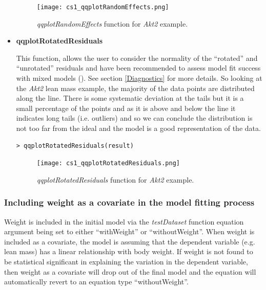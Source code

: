 \documentclass[12pt,a4paper]{article}
\begin{document}
\begin{itemize}
\begin{figure}[H]%
\centerline{\texttt{[image: cs1\_qqplotRandomEffects.png]}}
\caption{\textit{qqplotRandomEffects} function for \textit{Akt2} example.}\label{fig:20}
\end{figure}

\item \textbf{qqplotRotatedResiduals}

This function, allows the user to consider the normality of the ``rotated'' and ``unrotated'' residuals and have been recommended to assess model fit success with mixed models (\cite{RotatedResiduals04}). 
See section \ref{Diagnostics} for more details. 
So looking at the \textit{Akt2} lean mass example, the majority of the data points are distributed along the line. 
There is some systematic deviation at the tails but it is a small percentage of the points and as it is above and below the line it indicates long tails (i.e. outliers) 
and so we can conclude the distribution is not too far from the ideal and the model is a good representation of the data. 

\begingroup
    \fontsize{8pt}{12pt}\selectfont
\begin{verbatim}
> qqplotRotatedResiduals(result)
\end{verbatim}
\endgroup 

\begin{figure}[H]%
\centerline{\texttt{[image: cs1\_qqplotRotatedResiduals.png]}}
\caption{\textit{qqplotRotatedResiduals} function for \textit{Akt2} example.}\label{fig:21}
\end{figure}

\end{itemize}



\subsubsection{Including weight as a covariate in the model fitting process}
Weight is included in the initial model via the \textit{testDataset} function equation argument being set to either “withWeight” or “withoutWeight”.  
When weight is included as a covariate, the model is assuming that the dependent variable (e.g. lean mass) has a linear relationship with body weight. 
If weight is not found to be statistical significant in explaining the variation in the dependent variable, 
then weight as a covariate will drop out of the final model and the equation will automatically revert to an equation type “withoutWeight”.  
\end{document}

